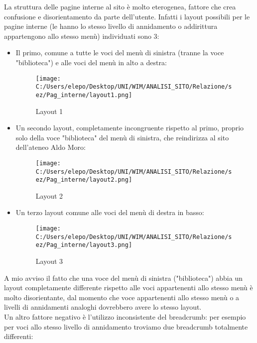 La struttura delle pagine interne al sito è molto eterogenea, fattore che crea confusione e disorientamento da parte dell'utente. Infatti i layout possibili per le pagine interne (le hanno lo stesso livello di annidamento o addirittura appartengono allo stesso menù) individuati sono 3:
	\begin{itemize}
		\item Il primo, comune a tutte le voci del menù di sinistra (tranne la voce "biblioteca") e alle voci del menù in alto a destra:
\begin{center}
\begin{figure}[h!]
           \begin{center}
           \texttt{[image: C:/Users/elepo/Desktop/UNI/WIM/ANALISI\_SITO/Relazione/sez/Pag\_interne/layout1.png]}
           \caption{Layout 1}
           \end{center}
  \end{figure}
\end{center}
		\item Un secondo layout, completamente incongruente rispetto al primo, proprio solo della voce "biblioteca" del menù di sinistra, che reindirizza al sito dell'ateneo Aldo Moro:
		\begin{center}
\begin{figure}[h!]
           \begin{center}
           \texttt{[image: C:/Users/elepo/Desktop/UNI/WIM/ANALISI\_SITO/Relazione/sez/Pag\_interne/layout2.png]}
           \caption{Layout 2}
           \end{center}
  \end{figure}
\end{center}
\newpage
		\item Un terzo layout comune alle voci del menù di destra in basso:
		\begin{center}
\begin{figure}[h!]
           \begin{center}
           \texttt{[image: C:/Users/elepo/Desktop/UNI/WIM/ANALISI\_SITO/Relazione/sez/Pag\_interne/layout3.png]}
           \caption{Layout 3}
           \end{center}
  \end{figure}
\end{center}
	\end{itemize}
A mio avviso il fatto che una voce del menù di sinistra ("biblioteca") abbia un layout completamente differente rispetto alle voci appartenenti allo stesso menù è molto disorientante, dal momento che voce appartenenti allo stesso menù o a livelli di annidamenti analoghi dovrebbero avere lo stesso layout.\\
Un altro fattore negativo è l'utilizzo inconsistente del breadcrumb: per esempio per voci allo stesso livello di annidamento troviamo due breadcrumb totalmente differenti:

